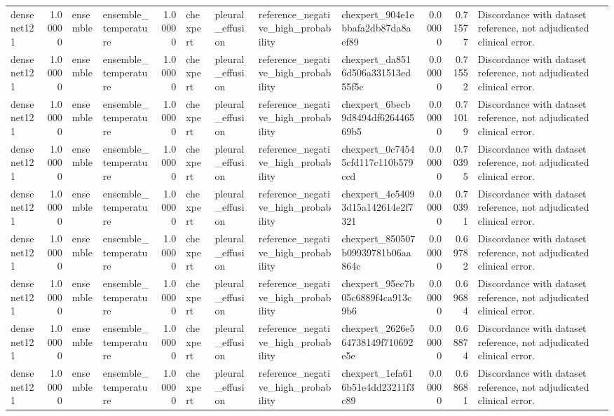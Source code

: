 \begin{tabular}{lrllrllllrrl}
densenet121 & 1.00000 & ensemble & ensemble\_temperature & 1.00000 & chexpert & pleural\_effusion & reference\_negative\_high\_probability & chexpert\_904e1ebbafa2db87da8aef89 & 0.00000 & 0.71577 & Discordance with dataset reference, not adjudicated clinical error. \\
densenet121 & 1.00000 & ensemble & ensemble\_temperature & 1.00000 & chexpert & pleural\_effusion & reference\_negative\_high\_probability & chexpert\_da8516d506a331513ed55f5c & 0.00000 & 0.71552 & Discordance with dataset reference, not adjudicated clinical error. \\
densenet121 & 1.00000 & ensemble & ensemble\_temperature & 1.00000 & chexpert & pleural\_effusion & reference\_negative\_high\_probability & chexpert\_6becb9d8494df626446569b5 & 0.00000 & 0.71019 & Discordance with dataset reference, not adjudicated clinical error. \\
densenet121 & 1.00000 & ensemble & ensemble\_temperature & 1.00000 & chexpert & pleural\_effusion & reference\_negative\_high\_probability & chexpert\_0c74545cfd117c110b579ccd & 0.00000 & 0.70395 & Discordance with dataset reference, not adjudicated clinical error. \\
densenet121 & 1.00000 & ensemble & ensemble\_temperature & 1.00000 & chexpert & pleural\_effusion & reference\_negative\_high\_probability & chexpert\_4e54093d15a142614e2f7321 & 0.00000 & 0.70391 & Discordance with dataset reference, not adjudicated clinical error. \\
densenet121 & 1.00000 & ensemble & ensemble\_temperature & 1.00000 & chexpert & pleural\_effusion & reference\_negative\_high\_probability & chexpert\_850507b09939781b06aa864c & 0.00000 & 0.69782 & Discordance with dataset reference, not adjudicated clinical error. \\
densenet121 & 1.00000 & ensemble & ensemble\_temperature & 1.00000 & chexpert & pleural\_effusion & reference\_negative\_high\_probability & chexpert\_95ec7b05c6889f4ca913c9b6 & 0.00000 & 0.69684 & Discordance with dataset reference, not adjudicated clinical error. \\
densenet121 & 1.00000 & ensemble & ensemble\_temperature & 1.00000 & chexpert & pleural\_effusion & reference\_negative\_high\_probability & chexpert\_2626e564738149f710692e5e & 0.00000 & 0.68874 & Discordance with dataset reference, not adjudicated clinical error. \\
densenet121 & 1.00000 & ensemble & ensemble\_temperature & 1.00000 & chexpert & pleural\_effusion & reference\_negative\_high\_probability & chexpert\_1efa616b51e4dd23211f3c89 & 0.00000 & 0.68681 & Discordance with dataset reference, not adjudicated clinical error. \\

\end{tabular}
